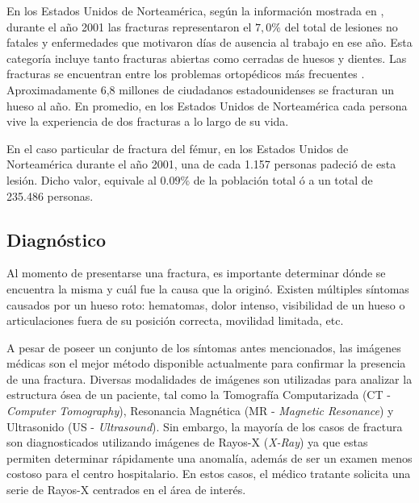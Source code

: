 En los Estados Unidos de Norteam\'erica, seg\'un la informaci\'on mostrada en \cite{NAT02}, durante el a\~no 2001 las fracturas representaron el $7,0\%$ del total de lesiones no fatales y enfermedades que motivaron d\'ias de ausencia al trabajo en ese a\~no. Esta categor\'ia incluye tanto fracturas abiertas como cerradas de huesos y dientes. Las fracturas se encuentran entre los problemas ortop\'edicos m\'as frecuentes \cite{DIS05}. Aproximadamente 6,8 millones de ciudadanos estadounidenses se fracturan un hueso al a\~no. En promedio, en los Estados Unidos de Norteam\'erica cada persona vive la experiencia de dos fracturas a lo largo de su vida.

En el caso particular de fractura del f\'emur, en los Estados Unidos de Norteam\'erica durante el a\~no 2001, una de cada 1.157 personas padeci\'o de esta lesi\'on. Dicho valor, equivale al $0.09\%$ de la poblaci\'on total \'o a un total de 235.486 personas.


\subsection{Diagn\'ostico}

Al momento de presentarse una fractura, es importante determinar d\'onde se encuentra la misma y cu\'al fue la causa que la origin\'o. Existen m\'ultiples s\'intomas causados por un hueso roto: hematomas, dolor intenso, visibilidad de un hueso o articulaciones fuera de su posici\'on correcta, movilidad limitada, etc.

A pesar de poseer un conjunto de los s\'intomas antes mencionados, las im\'agenes m\'edicas son el mejor m\'etodo disponible actualmente para confirmar la presencia de una fractura. Diversas modalidades de im\'agenes son utilizadas para analizar la estructura \'osea de un paciente, tal como la Tomograf\'ia Computarizada (CT - \textit{Computer Tomography}), Resonancia Magn\'etica (MR - \textit{Magnetic Resonance}) y Ultrasonido (US - \textit{Ultrasound}). Sin embargo, la mayor\'ia de los casos de fractura son diagnosticados utilizando im\'agenes de Rayos-X (\textit{X-Ray}) ya que estas permiten determinar r\'apidamente una anomal\'ia, adem\'as de ser un examen menos costoso para el centro hospitalario. En estos casos, el m\'edico tratante solicita una serie de Rayos-X centrados en el \'area de inter\'es.

